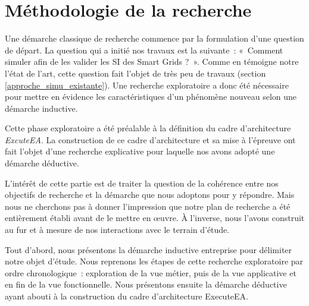 \chapter{Méthodologie de la recherche}
\label{ch:methodo}

Une démarche classique de recherche commence par la formulation d'une question 
de départ. La question qui a initié nos travaux est la suivante~: «~Comment 
simuler afin de les valider les SI des Smart Grids ?~».  Comme en témoigne notre 
l'état de l'art, cette question fait l'objet de très peu de travaux (section 
\ref{approche_simu_existante}). Une recherche exploratoire a donc été nécessaire 
pour mettre en évidence les caractéristiques d'un phénomène nouveau selon une 
démarche inductive. 

Cette phase exploratoire a été préalable à la définition du cadre d'architecture 
\textit{ExcuteEA}. La construction de ce cadre d'architecture et sa mise à 
l'épreuve ont fait l'objet d'une recherche explicative pour laquelle nos avons 
adopté une démarche déductive.

L'intérêt de cette partie est de traiter la question de la cohérence entre nos 
objectifs de recherche et la démarche que nous adoptons pour y répondre. Mais 
nous ne cherchons pas à donner l'impression que notre plan de recherche a été 
entièrement établi avant de le mettre en œuvre. À l'inverse, nous l'avons 
construit au fur et à mesure de nos interactions avec le terrain d'étude. 

Tout d'abord, nous présentons la démarche inductive entreprise pour délimiter 
notre objet d'étude. Nous reprenons les étapes de cette recherche exploratoire 
par ordre chronologique~: exploration de la vue métier, puis de la vue 
applicative et en fin de la vue fonctionnelle. Nous présentons ensuite la 
démarche déductive ayant abouti à la construction du cadre d'architecture 
ExecuteEA.


%


